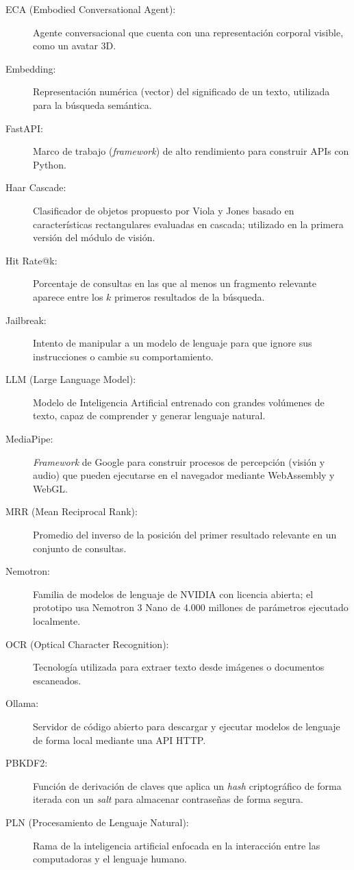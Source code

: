 \begin{description}
  \item[ECA (Embodied Conversational Agent):] Agente conversacional que cuenta con una representación corporal visible, como un avatar 3D.
  \item[Embedding:] Representación numérica (vector) del significado de un texto, utilizada para la búsqueda semántica.
  \item[FastAPI:] Marco de trabajo (\textit{framework}) de alto rendimiento para construir APIs con Python.
  \item[Haar Cascade:] Clasificador de objetos propuesto por Viola y Jones basado en características rectangulares evaluadas en cascada; utilizado en la primera versión del módulo de visión.
  \item[Hit Rate@k:] Porcentaje de consultas en las que al menos un fragmento relevante aparece entre los $k$ primeros resultados de la búsqueda.
  \item[Jailbreak:] Intento de manipular a un modelo de lenguaje para que ignore sus instrucciones o cambie su comportamiento.
  \item[LLM (Large Language Model):] Modelo de Inteligencia Artificial entrenado con grandes volúmenes de texto, capaz de comprender y generar lenguaje natural.
  \item[MediaPipe:] \textit{Framework} de Google para construir procesos de percepción (visión y audio) que pueden ejecutarse en el navegador mediante WebAssembly y WebGL.
  \item[MRR (Mean Reciprocal Rank):] Promedio del inverso de la posición del primer resultado relevante en un conjunto de consultas.
  \item[Nemotron:] Familia de modelos de lenguaje de NVIDIA con licencia abierta; el prototipo usa Nemotron 3 Nano de 4.000 millones de parámetros ejecutado localmente.
  \item[OCR (Optical Character Recognition):] Tecnología utilizada para extraer texto desde imágenes o documentos escaneados.
  \item[Ollama:] Servidor de código abierto para descargar y ejecutar modelos de lenguaje de forma local mediante una API HTTP.
  \item[PBKDF2:] Función de derivación de claves que aplica un \textit{hash} criptográfico de forma iterada con un \textit{salt} para almacenar contraseñas de forma segura.
  \item[PLN (Procesamiento de Lenguaje Natural):] Rama de la inteligencia artificial enfocada en la interacción entre las computadoras y el lenguaje humano.

\end{description}
